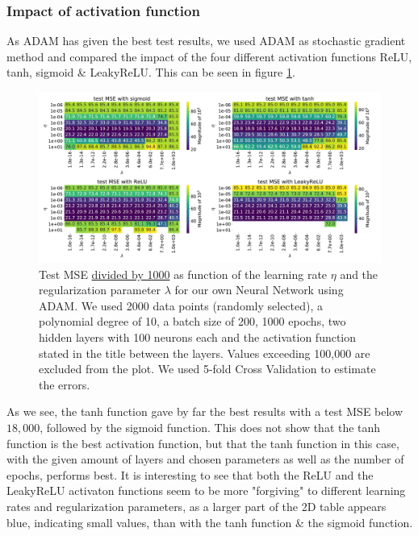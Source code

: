 \documentclass[11pt,a4paper,titlepage]{article}
\begin{document}
\subsubsection{Impact of activation function}
As ADAM has given the best test results, we used ADAM as stochastic gradient method and compared the impact of the four different activation functions ReLU, tanh, sigmoid \& LeakyReLU. This can be seen in figure \ref{fig:ADAMdifferentActivationFunctions}.
\begin{figure}[H]
\centering
\includegraphics[width=1.05\textwidth]{Four_activations2ADAM200010.pdf}
\caption[Different activation functions]{Test MSE \underline{divided by 1000} as function of the learning rate $\eta$ and the regularization parameter $\lambda$ for our own Neural Network using ADAM. We used 2000 data points (randomly selected), a polynomial degree of 10, a batch size of 200, 1000 epochs, two hidden layers with 100 neurons each and the activation function stated in the title between the layers. Values exceeding 100,000 are excluded from the plot. We used 5-fold Cross Validation to estimate the errors.} \label{fig:ADAMdifferentActivationFunctions}
\end{figure}
As we see, the tanh function gave by far the best results with a test MSE below $18,000$, followed by the sigmoid function. This does not show that the tanh function is the best activation function, but that the tanh function in this case, with the given amount of layers and chosen parameters as well as the number of epochs, performs best. It is interesting to see that both the ReLU and the LeakyReLU activaton functions seem to be more "forgiving" to different learning rates and regularization parameters, as a larger part of the 2D table appears blue, indicating small values, than with the tanh function \& the sigmoid function.\\
\end{document}
